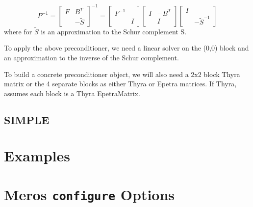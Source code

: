 \documentclass[oneeqnum,onefignum,onetabnum,10pt]{SANDreport}
\newcommand{\InlineCommand}[1]{
  {\hspace{0.01 in}} {\tt #1} {\hspace{0.01 in}}}
\begin{document}
\begin{equation}
     P^{-1} =
       \left[ \begin{array}{cc} F & B^T \\ & -\tilde S \end{array} \right]^{-1}
       = 
       \left[ \begin{array}{cc} F^{-1} &  \\  & I \end{array} \right]
       \left[ \begin{array}{cc} I & -B^T \\  & I \end{array} \right]
       \left[ \begin{array}{cc} I &  \\  & -\tilde S^{-1} \end{array} \right]
\end{equation}
where for $\tilde S$ is an approximation to the Schur complement S.

To apply the above preconditioner, we need a linear solver on the
(0,0) block and an approximation to the inverse of the Schur
complement.

To build a concrete preconditioner object, we will also need a 2x2
block Thyra matrix or the 4 separate blocks as either Thyra or Epetra
matrices.  If Thyra, assumes each block is a Thyra EpetraMatrix.




\subsection{SIMPLE}

\section{Examples}

\appendix

\section{Meros \InlineCommand{configure} Options}



    

\end{document}
